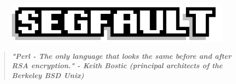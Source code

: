 \documentclass[9pt]{extarticle} %
\begin{document}

\pagestyle{fancy}
\fancyhf{}
\rhead{\today}
\addtolength\footskip{-15px}


\begin{figure}[H]
\centering\vspace{0.5cm}\includegraphics[width=0.8\linewidth]{imgs/segfault.png}
\end{figure}


\vspace{-15px}
\begin{quote}
\centering
\textbf{\textit{"Perl - The only language that looks the same before and after RSA encryption." - Keith Bostic (principal architects of the Berkeley BSD Unix)}}
\end{quote}
\vspace{10px}

\end{document}
